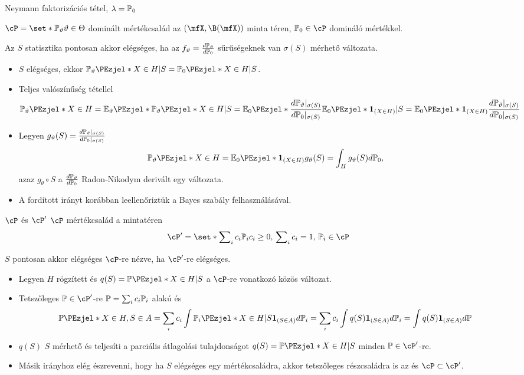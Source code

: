 \documentclass[aspectratio=169,notheorems,9pt,\option]{beamer}
\begin{document}
\begin{frame}{Neymann faktorizációs tétel, $\lambda=\P[0]$}
\begin{theorem}
  $\cP=\set*{\P[\theta]}{\theta\in\Theta}$ dominált mértékcsalád az 
  $(\mfX,\B(\mfX))$ minta téren, $\P[0]\in\cP$ domináló mértékkel. 
  
  Az $S$  statisztika pontosan akkor elégséges, ha az 
  $f_\theta=\frac{d\P[\theta]}{d\P[0]}$ 
  sűrűségeknek van $\sigma(S)$ mérhető változata.
\end{theorem}
\begin{itemize}
  \item $S$ elégséges, ekkor $\P[\theta]{X\in H|S}=\P[0]{X\in H|S}$.
  \item Teljes valószínűség tétellel
  \begin{displaymath}
    \P[\theta]{X\in H}
    =\E[\theta]{\P[\theta]{X\in H|S}}
    =\E[0]{\frac{d\P[\theta]|_{\sigma(S)}}{d\P[0]|_{\sigma(S)}}\E[0]{\I{X\in H}|S}}
    =\E[0]{\I{X\in H}\frac{d\P[\theta]|_{\sigma(S)}}{d\P[0]|_{\sigma(S)}}}
  \end{displaymath}
  \item Legyen $g_\theta(S)=\frac{d\P[\theta]|_{\sigma(S)}}{d\P[0]|_{\sigma(S)}}$
  \begin{displaymath}
    \P[\theta]{X\in H}=\E[0]{\I{X\in H}g_\theta(S)}=\int_H g_\theta(S)d\P[0],
  \end{displaymath}
  azaz $g_\theta\circ S$  a $\frac{d\P[\theta]}{d\P[0]}$ Radon-Nikodym derivált egy változata.
  \item A fordított irányt korábban leellenőriztük a Bayes szabály felhasználásával.
\end{itemize}
\end{frame}

\begin{frame}{$\cP$ és $\cP'$}
$\cP$ mértékcsalád a mintatéren
\begin{displaymath}
  \cP'=\set*{\sum\nolimits_i c_i\P[i]}{c_i\geq0,\,\sum\nolimits_i c_i=1,\,\P[i]\in\cP}  
\end{displaymath}
\begin{proposition}
  $S$ pontosan akkor elégséges $\cP$-re nézve, ha $\cP'$-re elégséges.
\end{proposition}
\begin{itemize}
  \item Legyen $H$ rögzített és $q(S)=\P{X\in H|S}$ a $\cP$-re vonatkozó közös változat. 
  \item Tetszőleges $\P\in\cP'$-re $\P=\sum_{i } c_i\P[i]$ alakú és 
  \begin{displaymath}
    \P{X\in H, S\in A}
    =\sum_{i} c_i\int \P[i]{X\in H|S}\I{S\in A}d\P[i]
    =\sum_i c_i\int q(S) \I{S\in A}d\P[i]
    =\int q(S)\I{S\in A}d\P
  \end{displaymath} 
  \item $q(S)$ $S$ mérhető és teljesíti a parciális átlagolási tulajdonságot $q(S)=\P{X\in H|S}$
  minden $\P\in\cP'$-re.
  \item Másik irányhoz elég észrevenni, hogy ha $S$ elégséges egy mértékcsaládra, 
  akkor tetszőleges részcsaládra is az és $\cP\subset\cP'$.
\end{itemize}
\end{frame}
\end{document}
